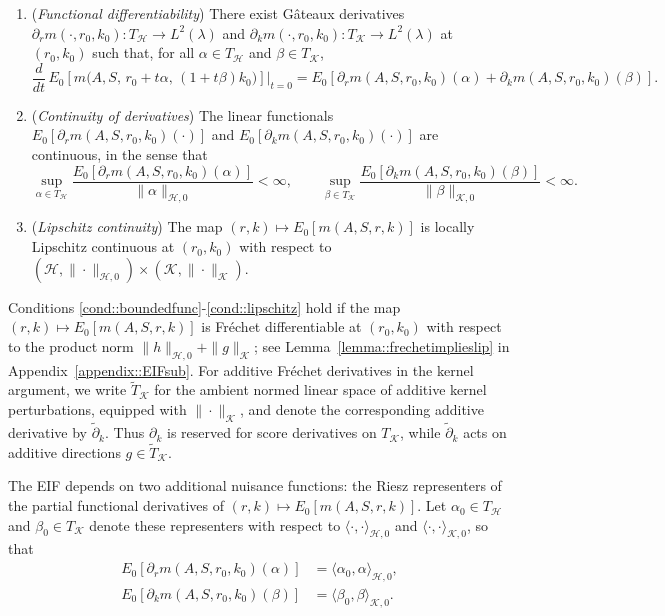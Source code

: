 \documentclass[12pt]{article}
\newcommand{\addTK}{\widetilde T_{\mathcal K}}
\newcommand{\adk}{\widetilde{\partial}_k}
\theoremstyle{plain}
\begin{document}
 


\begin{enumerate}[label=\textbf{(C\arabic*)}, ref=C\arabic*, series=cond]
\item (\textit{Functional differentiability}) \label{cond::boundedfunc} 
There exist Gâteaux derivatives
$\partial_r m(\cdot, r_0, k_0) : T_{\mathcal{H}} \to L^2(\lambda)$ 
and $\partial_k m(\cdot, r_0, k_0) : T_{\mathcal{K}} \to L^2(\lambda)$
at $(r_0, k_0)$ such that, for all $\alpha \in T_{\mathcal{H}}$ and $\beta \in T_{\mathcal{K}}$,
\[
   \frac{d}{dt}\, E_0\!\left[m\big(A,S,\, r_0 + t \alpha,\,(1+t\beta)k_0\big)\right]\Big|_{t=0}
   = E_0\!\left[\partial_r m(A,S,r_0,k_0)(\alpha) 
   + \partial_k m(A,S,r_0,k_0)(\beta)\right].
\]

\item (\textit{Continuity of derivatives}) \label{cond::boundedfunc2}
The linear functionals $E_0[\partial_r m(A,S,r_0,k_0)(\cdot)]$ and $E_0[\partial_k m(A,S,r_0,k_0)(\cdot)]$
are continuous, in the sense that
\[
\sup_{\alpha \in T_{\mathcal{H}}}
\frac{E_0[\partial_r m(A,S,r_0,k_0)(\alpha)]}{\|\alpha\|_{\mathcal{H}, 0}}
< \infty,
\qquad
\sup_{\beta \in T_{\mathcal{K}}}
\frac{E_0[\partial_k m(A,S,r_0,k_0)(\beta)]}{\|\beta\|_{\mathcal{K}, 0}}
< \infty.
\]
\item (\textit{Lipschitz continuity}) \label{cond::lipschitz} The map $(r,k) \mapsto E_0[m(A,S,r,k)]$ is locally Lipschitz continuous at $(r_0,k_0)$ with respect to $(\mathcal{H}, \|\cdot\|_{\mathcal{H}, 0}) \times (\mathcal{K}, \|\cdot\|_{\mathcal{K}})$.
\end{enumerate}
Conditions \ref{cond::boundedfunc}-\ref{cond::lipschitz} hold if the map
\((r,k)\mapsto E_0[m(A,S,r,k)]\) is Fréchet differentiable at \((r_0,k_0)\)
with respect to the product norm
\(\|h\|_{\mathcal{H},0} + \|g\|_{\mathcal{K}}\); see
Lemma~\ref{lemma::frechetimplieslip} in Appendix~\ref{appendix::EIFsub}.
For additive Fréchet derivatives in the kernel argument, we write
\(\addTK\) for the ambient normed linear space of additive kernel perturbations,
equipped with \(\|\cdot\|_{\mathcal K}\), and denote the corresponding
additive derivative by \(\adk\). Thus \(\partial_k\) is reserved for score
derivatives on \(T_{\mathcal K}\), while \(\adk\) acts on additive directions
\(g \in \addTK\).



 

The EIF depends on two additional nuisance functions: the Riesz representers of
the partial functional derivatives of \((r,k)\mapsto E_0[m(A,S,r,k)]\). Let
\(\alpha_0\in T_{\mathcal H}\) and \(\beta_0\in T_{\mathcal K}\) denote these
representers with respect to \(\langle\cdot,\cdot\rangle_{\mathcal H,0}\) and
\(\langle\cdot,\cdot\rangle_{\mathcal K,0}\), so that
\begin{align}
E_0[\partial_r m(A,S,r_0,k_0)(\alpha)]
&= \langle \alpha_0, \alpha \rangle_{\mathcal{H}, 0}, 
\label{eqn::rieszreward}
\\[1ex] 
E_0[\partial_k m(A,S,r_0,k_0)(\beta)]
&= \langle \beta_0, \beta \rangle_{\mathcal{K}, 0}.
\label{eqn::rieszkernel}
\end{align}
 
\end{document}
